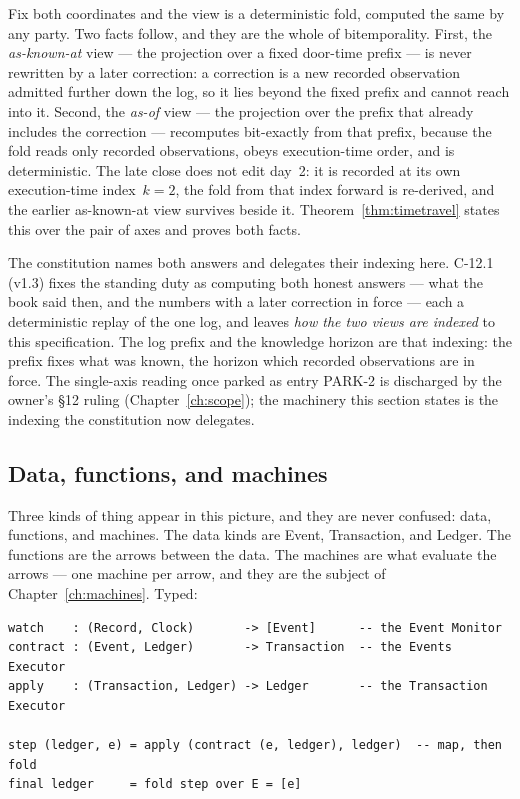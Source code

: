 \documentclass[11pt,a4paper]{article}
\begin{document}
Fix both coordinates and the view is a deterministic fold, computed the same by any party.
Two facts follow, and they are the whole of bitemporality. First, the \emph{as-known-at}
view --- the projection over a fixed door-time prefix --- is never rewritten by a later
correction: a correction is a new recorded observation admitted further down the log, so it
lies beyond the fixed prefix and cannot reach into it. Second, the \emph{as-of} view --- the
projection over the prefix that already includes the correction --- recomputes bit-exactly
from that prefix, because the fold reads only recorded observations, obeys execution-time
order, and is deterministic. The late close does not edit day~2: it is recorded at its own
execution-time index~$k=2$, the fold from that index forward is re-derived, and the earlier
as-known-at view survives beside it. Theorem~\ref{thm:timetravel} states this over the pair
of axes and proves both facts.

The constitution names both answers and delegates their indexing here. C-12.1 (v1.3) fixes
the standing duty as computing both honest answers --- what the book said then, and the
numbers with a later correction in force --- each a deterministic replay of the one log, and
leaves \emph{how the two views are indexed} to this specification. The log prefix and the
knowledge horizon are that indexing: the prefix fixes what was known, the horizon which
recorded observations are in force. The single-axis reading once parked as entry PARK-2 is
discharged by the owner's \S 12 ruling (Chapter~\ref{ch:scope}); the machinery this section
states is the indexing the constitution now delegates.

\subsection{Data, functions, and machines}

Three kinds of thing appear in this picture, and they are never confused: data,
functions, and machines. The data kinds are Event, Transaction, and Ledger. The functions are
the arrows between the data. The machines are what evaluate the arrows --- one machine per
arrow, and they are the subject of Chapter~\ref{ch:machines}. Typed:

\begin{lstlisting}
watch    : (Record, Clock)       -> [Event]      -- the Event Monitor
contract : (Event, Ledger)       -> Transaction  -- the Events Executor
apply    : (Transaction, Ledger) -> Ledger       -- the Transaction Executor

step (ledger, e) = apply (contract (e, ledger), ledger)  -- map, then fold
final ledger     = fold step over E = [e]
\end{lstlisting}
\end{document}
